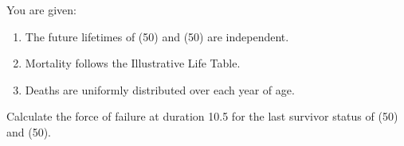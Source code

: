 You are given:
\begin{enumerate}
\item The future lifetimes of (50) and (50) are independent.
\item Mortality follows the Illustrative Life Table.
\item Deaths are uniformly distributed over each year of age.
\end{enumerate}
Calculate the force of failure at duration 10.5 for the last survivor status of (50) and (50).


